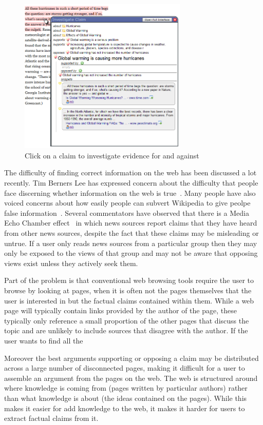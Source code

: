 \documentclass{chi2009}
\begin{document}
\begin{figure}[tb]
	\begin{center}
	\includegraphics[width=8cm]{../screenshots/claim_popup_crop2.png}
	\caption{Click on a claim to investigate evidence for and against}
	\label{claimview}
	\end{center}
\end{figure}

The difficulty of finding correct information on the web has been discussed a lot recently. Tim Berners Lee has expressed concern about the difficulty that people face discerning whether information on the web is true~\cite{bbcwebwarning}. Many people have also voiced concerns about how easily people can subvert Wikipedia to give peolpe false information~\cite{wikifalse}. Several commentators have observed that there is a Media Echo Chamber effect~\cite{echochamber,echochamber2} in which news sources report claims that they have heard from other news sources, despite the fact that these claims may be misleading or untrue. If a user only reads news sources from a particular group then they may only be exposed to the views of that group and may not be aware that opposing views exist unless they actively seek them.  

Part of the problem is that conventional web browsing tools require the user to browse by looking at pages, when it is often not the pages themselves that the user is interested in but the factual claims contained within them. While a web page will typically contain links provided by the author of the page, these typically only reference a small proportion of the other pages that discuss the topic and are unlikely to include sources that disagree with the author. If the user wants to find all the 

 Moreover the best arguments supporting or opposing a claim may be distributed across a large number of disconnected pages, making it difficult for a user to assemble an argument from the pages on the web. The web is structured around where knowledge is coming from (pages written by particular authors) rather than what knowledge is about (the ideas contained on the pages). While this makes it easier for add knowledge to the web, it makes it harder for users to extract factual claims from it.
\end{document}
